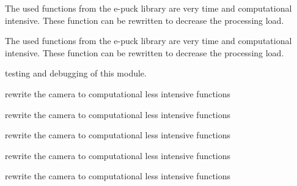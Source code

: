 
\begin{DoxyRefList}
\item[\label{todo__todo000005}%
\hypertarget{todo__todo000005}{}%
Module \hyperlink{group__camera}{camera} ]The used functions from the e-\/puck library are very time and computational intensive. These function can be rewritten to decrease the processing load. 
\item[\label{todo__todo000001}%
\hypertarget{todo__todo000001}{}%
File \hyperlink{camera_8c}{camera.c} ]The used functions from the e-\/puck library are very time and computational intensive. These function can be rewritten to decrease the processing load.  
\item[\label{todo__todo000006}%
\hypertarget{todo__todo000006}{}%
Module \hyperlink{group__i2c}{i2c} ]testing and debugging of this module. 
\item[\label{todo__todo000004}%
\hypertarget{todo__todo000004}{}%
global\+Scope$>$ Global \hyperlink{camera_8c_a559013ac1bda7cdf1b2518bacd32e0e7}{Sys\+\_\+\+Camera\+\_\+\+Pre\+Processor} (void)]rewrite the camera to computational less intensive functions 
\item[\label{todo__todo000002}%
\hypertarget{todo__todo000002}{}%
global\+Scope$>$ Global \hyperlink{camera_8h_aeefbe8dd86aa2b4588e5e5aa596d41fe}{Sys\+\_\+\+Init\+\_\+\+Camera} (void)]rewrite the camera to computational less intensive functions 
\item[\label{todo__todo000002}%
\hypertarget{todo__todo000002}{}%
global\+Scope$>$ Global \hyperlink{camera_8h_aeefbe8dd86aa2b4588e5e5aa596d41fe}{Sys\+\_\+\+Init\+\_\+\+Camera} (void)]rewrite the camera to computational less intensive functions 
\item[\label{todo__todo000003}%
\hypertarget{todo__todo000003}{}%
global\+Scope$>$ Global \hyperlink{camera_8h_ac44e432642eee885441e01f976e2c969}{Sys\+\_\+\+Start\+\_\+\+Camera} (void)]rewrite the camera to computational less intensive functions 
\item[\label{todo__todo000003}%
\hypertarget{todo__todo000003}{}%
global\+Scope$>$ Global \hyperlink{camera_8h_ac44e432642eee885441e01f976e2c969}{Sys\+\_\+\+Start\+\_\+\+Camera} (void)]rewrite the camera to computational less intensive functions
\end{DoxyRefList}